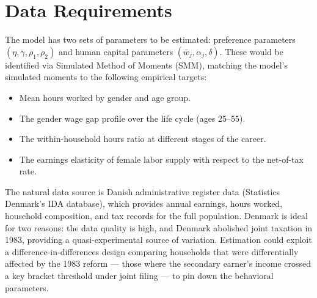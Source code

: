 \section{Data Requirements}

The model has two sets of parameters to be estimated: preference parameters $(\eta, \gamma, \rho_1, \rho_2)$ and human capital parameters $(\bar{w}_j, \alpha_j, \delta)$.
These would be identified via Simulated Method of Moments (SMM), matching the model's simulated moments to the following empirical targets:

\begin{itemize}
    \item Mean hours worked by gender and age group.
    \item The gender wage gap profile over the life cycle (ages 25--55).
    \item The within-household hours ratio at different stages of the career.
    \item The earnings elasticity of female labor supply with respect to the net-of-tax rate.
\end{itemize}

\noindent The natural data source is Danish administrative register data (Statistics Denmark's IDA database), which provides annual earnings, hours worked, household composition, and tax records for the full population.
Denmark is ideal for two reasons: the data quality is high, and Denmark abolished joint taxation in 1983, providing a quasi-experimental source of variation.
Estimation could exploit a difference-in-differences design comparing households that were differentially affected by the 1983 reform --- those where the secondary earner's income crossed a key bracket threshold under joint filing --- to pin down the behavioral parameters.

\newpage


